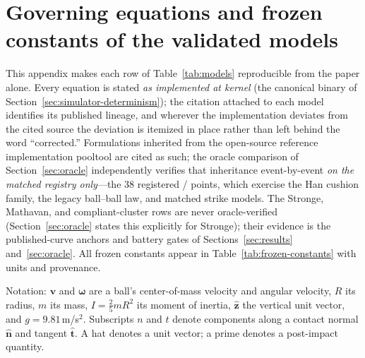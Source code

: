 \section{Governing equations and frozen constants of the validated models}
\label{sec:appendix-equations}

This appendix makes each row of Table~\ref{tab:models} reproducible from
the paper alone. Every equation is stated \emph{as implemented at kernel
} (the canonical binary of
Section~\ref{sec:simulator-determinism}); the citation attached to each
model identifies its published lineage, and wherever the implementation
deviates from the cited source the deviation is itemized in place rather
than left behind the word ``corrected.'' Formulations inherited from the
open-source reference implementation pooltool \citep{kiefl2024pooltool}
are cited as such; the oracle comparison of Section~\ref{sec:oracle}
independently verifies that inheritance event-by-event \emph{on the
matched registry only}---the 38 registered /
points, which exercise the Han cushion family, the legacy ball--ball
law, and matched strike models. The Stronge, Mathavan, and
compliant-cluster rows are never oracle-verified (Section~\ref{sec:oracle}
states this explicitly for Stronge); their evidence is the
published-curve anchors and battery gates of
Sections~\ref{sec:results} and~\ref{sec:oracle}. All frozen
constants appear in Table~\ref{tab:frozen-constants} with units and
provenance.

Notation: $\mathbf{v}$ and $\boldsymbol{\omega}$ are a ball's
center-of-mass velocity and angular velocity, $R$ its radius, $m$ its
mass, $I = \tfrac{2}{5}mR^{2}$ its moment of inertia,
$\hat{\mathbf{z}}$ the vertical unit vector, and $g = 9.81$\,m/s$^2$.
Subscripts $n$ and $t$ denote components along a contact normal
$\hat{\mathbf{n}}$ and tangent $\hat{\mathbf{t}}$. A hat denotes a unit
vector; a prime denotes a post-impact quantity.

